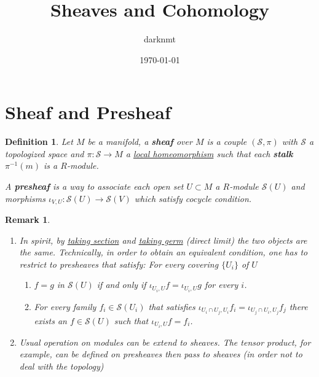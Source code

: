 \documentclass[11pt]{article}
\author{darknmt}
\date{\today}
\title{Sheaves and Cohomology}
\newtheorem{remark}{Remark}
\newtheorem{definition}{Definition}
\begin{document}
\maketitle
\tableofcontents

\section{Sheaf and Presheaf}
\label{sec:org89ea00e}
\begin{definition}
Let \(M\) be a manifold, a \textbf{sheaf} over \(M\) is a couple \((\mathcal{S}, \pi)\) with \(\mathcal{S}\) a topologized space and \(\pi: \mathcal{S}\longrightarrow M\) a \uline{local
homeomorphism} such that each \textbf{stalk} \(\pi^{-1}(m)\) is a \(R\)-module.

A \textbf{presheaf} is a way to associate each open set \(U\subset M\) a \(R\)-module \(\mathcal{S}(U)\) and morphisms \(\iota_{V,U}: \mathcal{S}(U) \longrightarrow
\mathcal{S}(V)\) which satisfy cocycle condition.
\end{definition}

\begin{remark}
\begin{enumerate}
\item In spirit, by \uline{taking section} and \uline{taking germ} (direct limit) the two objects are the
same. Technically, in order to obtain an equivalent condition, one has to restrict to
presheaves that satisfy: For every covering \(\{U_i\}\) of \(U\)
\begin{enumerate}
\item \(f=g\) in \(\mathcal{S}(U)\) if and only if \(\iota_{U_i, U} f = \iota_{U_i, U} g\) for every \(i\).
\item For every family \(f_i \in \mathcal{S}(U_i)\) that satisfies \(\iota_{U_i\cap
      U_j, U_i}f_i = \iota_{U_j\cap U_i, U_j}f_j\) there exists an \(f \in
      \mathcal{S}(U)\) such that \(\iota_{U_i,U} f = f_i\).
\end{enumerate}
\item Usual operation on modules can be extend to sheaves. The tensor product, for example,
can be defined on presheaves then pass to sheaves (in order not to deal with the
topology)
\end{enumerate}
\end{remark}
\end{document}
